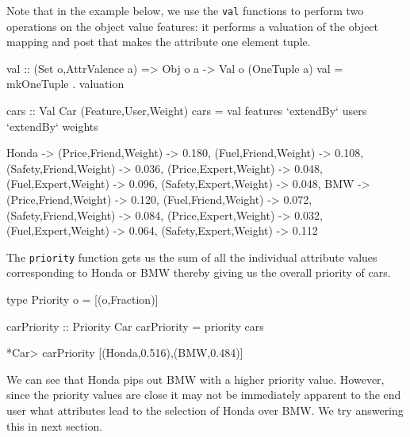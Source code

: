 \documentclass{jfp}
\newcommand{\prog}[1]{\texttt{#1}}
\begin{document}




Note that in the example below, we use the \prog{val} functions to perform two operations on the object value features: it performs a valuation of the object mapping and post that makes the attribute one element tuple.
\begin{haskellcode}
val :: (Set o,AttrValence a) => Obj o a -> Val o (OneTuple a)
val = mkOneTuple . valuation

cars :: Val Car (Feature,User,Weight)
cars = val features `extendBy` users `extendBy` weights

{Honda -> {(Price,Friend,Weight) -> 0.180,
           (Fuel,Friend,Weight) -> 0.108,
           (Safety,Friend,Weight) -> 0.036,
           (Price,Expert,Weight) -> 0.048,
           (Fuel,Expert,Weight) -> 0.096,
           (Safety,Expert,Weight) -> 0.048},
 BMW -> {(Price,Friend,Weight) -> 0.120,
         (Fuel,Friend,Weight) -> 0.072,
         (Safety,Friend,Weight) -> 0.084,
         (Price,Expert,Weight) -> 0.032,
         (Fuel,Expert,Weight) -> 0.064,
         (Safety,Expert,Weight) -> 0.112}}
\end{haskellcode}

The \prog{priority} function gets us the sum of all the individual attribute values corresponding to Honda or BMW thereby giving us the overall priority of cars.
\begin{haskellcode}
type Priority o = [(o,Fraction)]

carPriority :: Priority Car 
carPriority = priority cars

*Car> carPriority
[(Honda,0.516),(BMW,0.484)]
\end{haskellcode}
We can see that Honda pips out BMW with a higher priority value. However, since the priority values are close it may not be immediately apparent to the end user what attributes lead to the selection of Honda over BMW. We try answering this in next section. 
\end{document}
